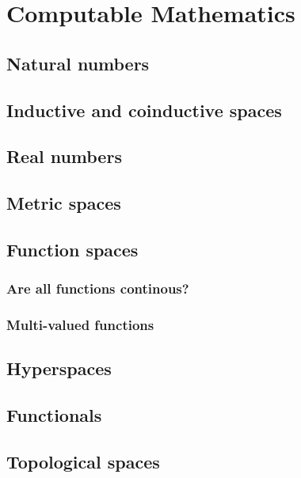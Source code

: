 \chapter{Computable Mathematics}
\label{chap:computable-mathematics}

\section{Natural numbers}
\label{sec:natural-numbers}

\section{Inductive and coinductive spaces}
\label{sec:inductive-coinductive}


\section{Real numbers}
\label{sec:real-numbers}

\section{Metric spaces}
\label{sec:metric-spaces}


\section{Function spaces}
\label{sec:function-spaces}

\subsection{Are all functions continous?}
\label{sec:all-fun-cont}

\subsection{Multi-valued functions}
\label{sec:multi-valued-functions}



\section{Hyperspaces}
\label{sec:hyperspaces}


\section{Functionals}
\label{sec:functionals}


\section{Topological spaces}
\label{sec:topological-spaces}



